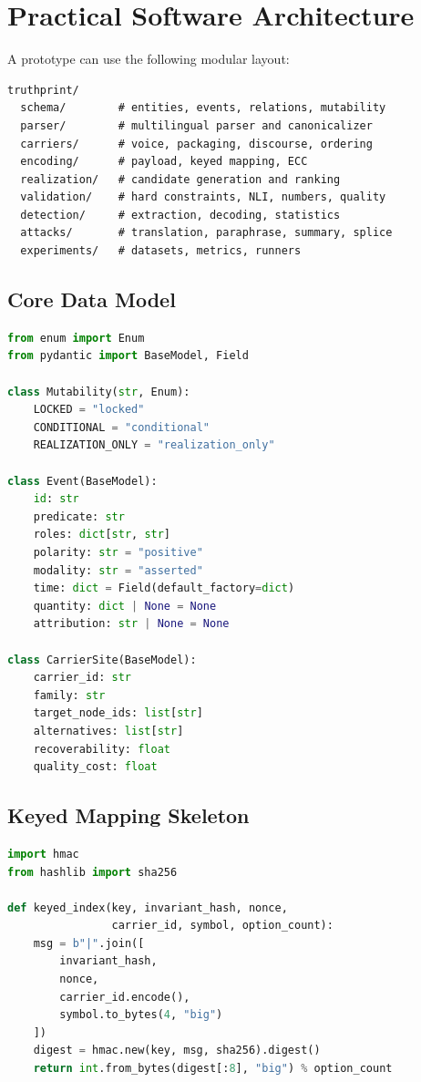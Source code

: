 \documentclass[11pt]{article}
\begin{document}
\section{Practical Software Architecture}
\label{app:arch}
A prototype can use the following modular layout:
\begin{lstlisting}
truthprint/
  schema/        # entities, events, relations, mutability
  parser/        # multilingual parser and canonicalizer
  carriers/      # voice, packaging, discourse, ordering
  encoding/      # payload, keyed mapping, ECC
  realization/   # candidate generation and ranking
  validation/    # hard constraints, NLI, numbers, quality
  detection/     # extraction, decoding, statistics
  attacks/       # translation, paraphrase, summary, splice
  experiments/   # datasets, metrics, runners
\end{lstlisting}

\subsection{Core Data Model}
\begin{lstlisting}[language=Python,caption={Illustrative Python data model.}]
from enum import Enum
from pydantic import BaseModel, Field

class Mutability(str, Enum):
    LOCKED = "locked"
    CONDITIONAL = "conditional"
    REALIZATION_ONLY = "realization_only"

class Event(BaseModel):
    id: str
    predicate: str
    roles: dict[str, str]
    polarity: str = "positive"
    modality: str = "asserted"
    time: dict = Field(default_factory=dict)
    quantity: dict | None = None
    attribution: str | None = None

class CarrierSite(BaseModel):
    carrier_id: str
    family: str
    target_node_ids: list[str]
    alternatives: list[str]
    recoverability: float
    quality_cost: float
\end{lstlisting}

\subsection{Keyed Mapping Skeleton}
\begin{lstlisting}[language=Python,caption={Secret-keyed carrier assignment skeleton.}]
import hmac
from hashlib import sha256

def keyed_index(key, invariant_hash, nonce,
                carrier_id, symbol, option_count):
    msg = b"|".join([
        invariant_hash,
        nonce,
        carrier_id.encode(),
        symbol.to_bytes(4, "big")
    ])
    digest = hmac.new(key, msg, sha256).digest()
    return int.from_bytes(digest[:8], "big") % option_count
\end{lstlisting}
\end{document}
